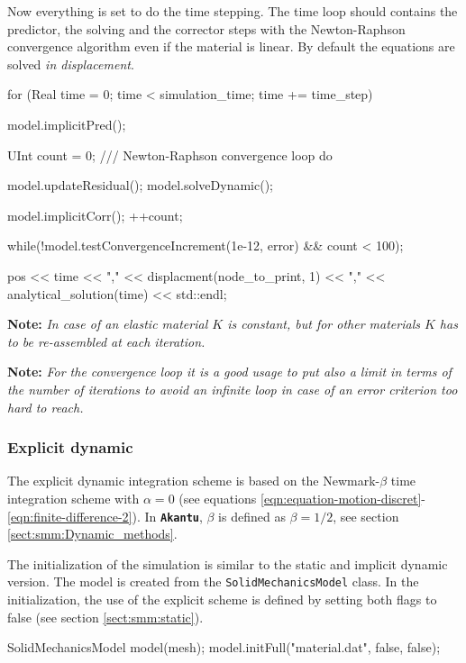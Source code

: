 \documentclass[a4paper,11pt]{book}
\newcommand{\akantu}{\texttt{\textbf{Akantu}}\xspace}
\newcommand{\code}[1]{\texttt{#1}}
\newcommand{\note}[1]{\textbf{Note: }\textit{#1}}
\begin{document}
Now everything is set to do the time stepping. The time loop should contains the
predictor,  the  solving  and   the  corrector  steps  with  the  Newton-Raphson
convergence algorithm even  if the material is linear.  By default the equations
are  solved  \emph{in  displacement}.   
\begin{cpp}
  for (Real time = 0; time < simulation_time; time += time_step) {
   model.implicitPred();

   UInt count = 0;
   /// Newton-Raphson convergence loop
   do {
     model.updateResidual();
     model.solveDynamic();

     model.implicitCorr();
     ++count;
   } while(!model.testConvergenceIncrement(1e-12, error) && count < 100);

   pos << time
       << "," << displacment(node_to_print, 1)
       << "," << analytical_solution(time) << std::endl;
 }
\end{cpp}

\note{In case  of an elastic material  $K$ is constant, but  for other materials
  $K$ has to be re-assembled at each iteration.}

\note{For the convergence loop  it is a good usage to put  also a limit in terms
  of the  number of iterations  to avoid  an infinite loop  in case of  an error
  criterion too hard to reach.}

\subsubsection{Explicit dynamic}

The explicit dynamic integration scheme is based on the Newmark-$\beta$ time integration 
scheme with $\alpha=0$ (see equations \ref{eqn:equation-motion-discret}-\ref{eqn:finite-difference-2}).
In \akantu, $\beta$ is defined as $\beta=1/2$, see section \ref{sect:smm:Dynamic_methods}.

The initialization of the simulation is similar to the static and implicit dynamic version. 
The model is created from the \code{SolidMechanicsModel} class. 
In the initialization, the use of the explicit scheme is defined by setting both flags 
to false (see section \ref{sect:smm:static}). 

\begin{cpp}
  SolidMechanicsModel model(mesh);
  model.initFull("material.dat", false, false);
\end{cpp}
\end{document}
